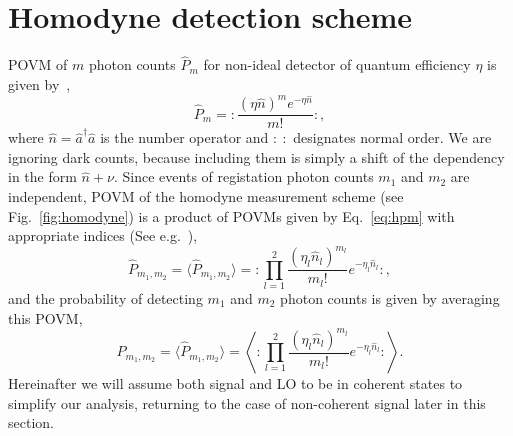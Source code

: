\section{Homodyne detection scheme}\label{sec-homodyne}
{POVM of $m$ photon counts $\hat P_m$ for non-ideal detector of quantum efficiency $\eta$ is given by{~\cite{kelley1964theory}}},
\begin{equation}
    \hat{P}_m=:\frac{(\eta \hat{n})^me^{-\eta \hat{n}}}{m!}:, \label{eq:hpm}
\end{equation}
where $\hat{n}=\hat{a}^\dag\hat{a}$ is the number operator and $:\ :$ designates normal order. {We are ignoring dark counts, because including them is simply a shift of the dependency in the form $\hat{n}+\nu$}.  Since events of registation photon counts $m_1$ and $m_2$ are independent, POVM of the homodyne measurement scheme  (see Fig.~\ref{fig:homodyne}) is a product of POVMs given by Eq.{~\eqref{eq:hpm}} with appropriate indices (See e.g.{~\cite{vogel1993statistics}}),
\begin{equation}
    \hat{P}_{m_1,m_2}=\langle\hat{P}_{m_1,m_2}\rangle =
    :\prod_{l=1}^2\frac{(\eta_l\hat{n}_l)^{m_l}}{m_l!}
    e^{-\eta_l\hat{n}_l}
    :,
\end{equation}
{and the probability of detecting $m_1$ and $m_2$ photon counts is given by averaging this POVM,}
\begin{equation}
    P_{m_1,m_2}=\langle\hat{P}_{m_1,m_2}\rangle =\left\langle
    :\prod_{l=1}^2\frac{(\eta_l\hat{n}_l)^{m_l}}{m_l!}
    e^{-\eta_l\hat{n}_l}
    :
    \right\rangle.\label{eq:h-sred}
\end{equation}
{Hereinafter we will assume both signal and LO to be in coherent states to simplify our analysis, returning to the case of non-coherent signal later in this section.}

